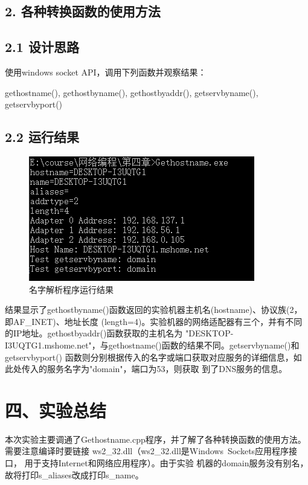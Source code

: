 \documentclass[UTF8]{ctexart}
\begin{document}
\subsection*{\textbf{2. 各种转换函数的使用方法}}
\subsection*{2.1 设计思路}

使用windows socket API，调用下列函数并观察结果：

gethostname(), gethostbyname(), gethostbyaddr(), getservbyname(), getservbyport()

\subsection*{2.2 运行结果}

\begin{figure}[H]
\includegraphics[width=\textwidth]{pic/DNS.PNG}
\caption{名字解析程序运行结果}
\end{figure}

结果显示了gethostbyname()函数返回的实验机器主机名(hostname)、协议族(2，即AF\_INET)、地址长度
(length=4)。实验机器的网络适配器有三个，并有不同的IP地址。gethostbyaddr()函数获取的主机名为
"DESKTOP-I3UQTG1.mshome.net"，与gethostname()函数的结果不同。getservbyname()和getservbyport()
函数则分别根据传入的名字或端口获取对应服务的详细信息，如此处传入的服务名字为"domain"，端口为53，则获取
到了DNS服务的信息。

\section*{四、实验总结}

本次实验主要调通了Gethostname.cpp程序，并了解了各种转换函数的使用方法。需要注意编译时要链接
ws2\_32.dll（ws2\_32.dll是Windows\ Sockets应用程序接口， 用于支持Internet和网络应用程序）。由于实验
机器的domain服务没有别名，故将打印s\_aliases改成打印s\_name。
\end{document}
